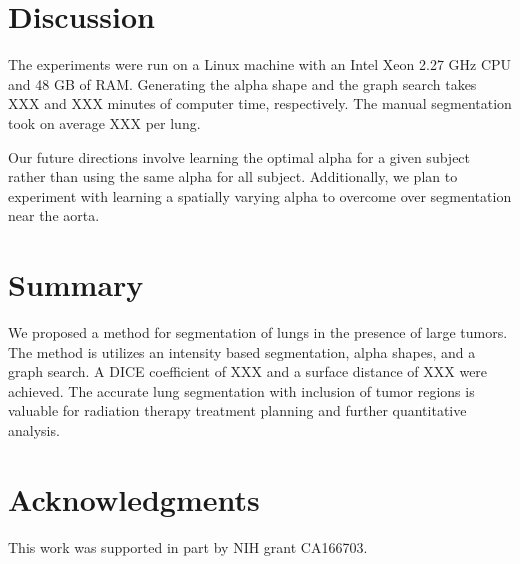 \documentclass{llncs}
\begin{document}
\section{Discussion}
%
The experiments were run on a Linux machine with an Intel Xeon 2.27 GHz CPU and 48 GB of RAM. Generating the alpha shape and the graph search takes XXX and XXX minutes of computer time, respectively. The manual segmentation took on average XXX per lung.

Our future directions involve learning the optimal alpha for a given subject rather than using the same alpha for all subject. Additionally, we plan to experiment with learning a spatially varying alpha to overcome over segmentation near the aorta.
%
\section{Summary}
%
We proposed a method for segmentation of lungs in the presence of large tumors. The method is utilizes an intensity based segmentation, alpha shapes, and a graph search. A DICE coefficient of XXX and a surface distance of XXX were achieved. The accurate lung segmentation with  inclusion of tumor regions is valuable for radiation therapy treatment planning and further quantitative analysis.
%
\section{Acknowledgments}
%
This work was supported in part by NIH grant CA166703.



%
%









\clearpage
{} %
\renewcommand{\indexname}{Author Index}
\printindex
\clearpage
\iffalse
\addtocmark[2]{Subject Index} %
\markboth{Subject Index}{Subject Index}
\renewcommand{\indexname}{Subject Index}

\fi
\end{document}
